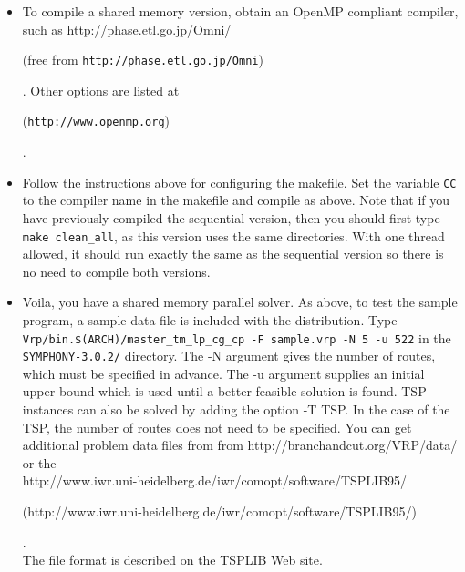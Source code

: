 \begin{itemize}
        \item To compile a shared memory version, obtain an OpenMP
        compliant compiler, such as 
        {http://phase.etl.go.jp/Omni/}
\begin{latexonly} 
        (free from {\tt http://phase.etl.go.jp/Omni})
\end{latexonly}. 
        Other options are listed at 
\begin{latexonly}
        ({\tt http://www.openmp.org})
\end{latexonly}.

        \item Follow the instructions above for configuring the makefile. Set
the variable {\tt CC} to the compiler name in the makefile and compile as
above. Note that if you have previously compiled the sequential version, then
you should first type {\tt make clean\_all}, as this version uses the same
directories.  With one thread allowed, it should run exactly the same as the
sequential version so there is no need to compile both versions.

        \item Voila, you have a shared memory parallel solver. As above, to
test the sample program, a sample data file is included with the
distribution. Type {\tt Vrp/bin.\$(ARCH)/master\_tm\_lp\_cg\_cp -F sample.vrp
-N 5 -u 522} in the {\tt SYMPHONY-3.0.2/} directory. The -N argument gives the number
of routes, which must be specified in advance. The -u argument supplies an
initial upper bound which is used until a better feasible solution is
found. TSP instances can also be solved by adding the option -T TSP. In the
case of the TSP, the number of routes does not need to be specified. You can
get additional problem data files from from  {http://branchandcut.org/VRP/data/} or the
\\ 
{http://www.iwr.uni-heidelberg.de/iwr/comopt/software/TSPLIB95/}
\begin{latexonly}
        (http://www.iwr.uni-heidelberg.de/iwr/comopt/software/TSPLIB95/)
\end{latexonly}. \\
The file format is described on the TSPLIB Web site.

\end{itemize}

